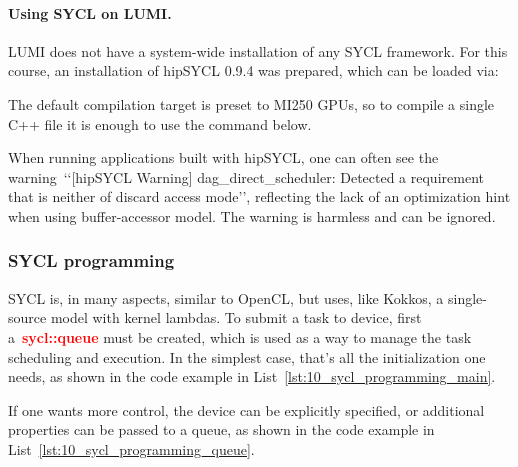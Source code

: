 \paragraph{Using SYCL on LUMI.}
LUMI does not have a system-wide installation of any SYCL framework.
For this course, an installation of hipSYCL 0.9.4 was prepared, which can be loaded via:

The default compilation target is preset to MI250 GPUs, so to compile a single C++ file it is enough to use the command below.

When running applications built with hipSYCL, one can often see the warning~\lq\lq [hipSYCL Warning] dag\_direct\_scheduler: Detected a requirement that is neither of discard access mode\rq\rq, reflecting the lack of an optimization hint when using buffer-accessor model.
The warning is harmless and can be ignored.


\subsubsection{SYCL programming}


\par
SYCL is, in many aspects, similar to OpenCL, but uses, like Kokkos, a single-source model with kernel lambdas.
To submit a task to device, first a~\textbf{\textcolor{red}{sycl::queue}} must be created, which is used as a way to manage the task scheduling and execution.
In the simplest case, that’s all the initialization one needs, as shown in the code example in List~\ref{lst:10_sycl_programming_main}.





\par
If one wants more control, the device can be explicitly specified, or additional properties can be passed to a queue, as shown in the code example in List~\ref{lst:10_sycl_programming_queue}.






